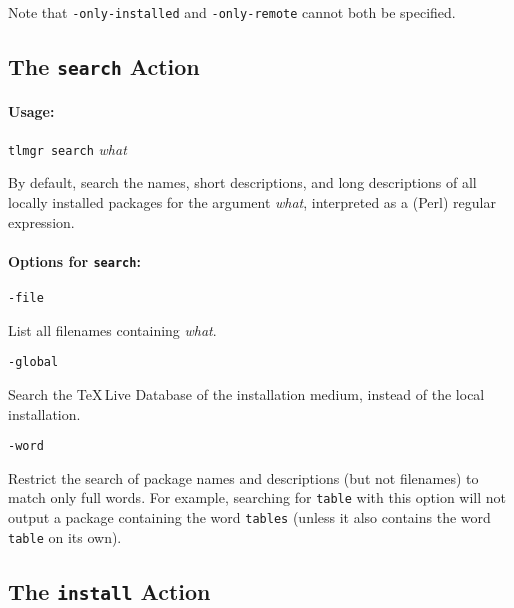 \documentclass[11pt]{article}
\begin{document}
Note that \texttt{-only-installed} and \texttt{-only-remote}
cannot both be specified.

\clearpage

\subsection{The {\tt search} Action}
\label{search}

\paragraph{Usage:}
\begin{list}{}{}

\item \texttt{tlmgr search} \textsl{what} \end{list} By
default, search the names, short descriptions, and long
descriptions of all locally installed packages for the
argument \textsl{what}, interpreted as a (Perl) regular
expression.

\paragraph{Options for {\tt search}:}

\begin{description}

\item\texttt{-file}\par 

List all filenames containing \textsl{what}.

\item\texttt{-global}\par 

Search the \TeX\,Live Database of the installation medium,
instead of the local installation.

\item\texttt{-word}\par 

Restrict the search of package names and descriptions (but
not filenames) to match only full words. For example,
searching for \texttt{table} with this option will not
output a package containing the word \texttt{tables} (unless
it also contains the word \texttt{table} on its own).

\end{description}

\clearpage

\subsection{The {\tt install} Action}
\label{install}
\end{document}
